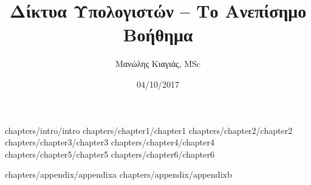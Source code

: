 \documentclass[a4paper,twoside,12pt]{book}
\author{Μανώλης Κιαγιάς, MSc}
\title{Δίκτυα Υπολογιστών -- Το Ανεπίσημο Βοήθημα}
\date{04/10/2017}
\newif\ifextrachapters
\begin{document}
\ifextrachapters
 {chapters/chapter7/chapter7}
 {chapters/chapter8/chapter8}
\else
\frontmatter
 {chapters/intro/intro}
\mainmatter
 {chapters/chapter1/chapter1}
 {chapters/chapter2/chapter2}
 {chapters/chapter3/chapter3}
 {chapters/chapter4/chapter4}
 {chapters/chapter5/chapter5}
 {chapters/chapter6/chapter6}
\fi
\appendix
 {chapters/appendix/appendixa}
 {chapters/appendix/appendixb}
\end{document}
